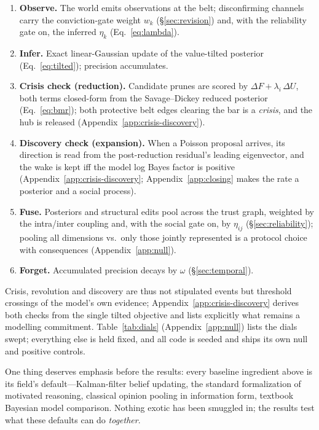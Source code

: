 \documentclass[runningheads]{llncs}
\begin{document}
\begin{enumerate}\itemsep1pt
\item \textbf{Observe.} The world emits observations at the belt; disconfirming channels carry
the conviction-gate weight $w_k$ (\S\ref{sec:revision}) and, with the reliability gate on, the
inferred $\eta_k$ (Eq.~\ref{eq:lambda}).
\item \textbf{Infer.} Exact linear-Gaussian update of the value-tilted posterior
(Eq.~\ref{eq:tilted}); precision accumulates.
\item \textbf{Crisis check (reduction).} Candidate prunes are scored by
$\Delta F+\lambda_i\,\Delta U$, both terms closed-form from the Savage--Dickey reduced
posterior (Eq.~\ref{eq:bmr}); both protective belt edges clearing the bar is a \emph{crisis},
and the hub is released (Appendix~\ref{app:crisis-discovery}).
\item \textbf{Discovery check (expansion).} When a Poisson proposal arrives, its direction is
read from the post-reduction residual's leading eigenvector, and the wake is kept iff the
model log Bayes factor is positive (Appendix~\ref{app:crisis-discovery};
Appendix~\ref{app:closing} makes the rate a posterior and a social process).
\item \textbf{Fuse.} Posteriors and structural edits pool across the trust graph, weighted by
the intra/inter coupling and, with the social gate on, by $\eta_{ij}$
(\S\ref{sec:reliability}); pooling all dimensions vs.\ only those jointly represented is a
protocol choice with consequences (Appendix~\ref{app:null}).
\item \textbf{Forget.} Accumulated precision decays by $\omega$ (\S\ref{sec:temporal}).
\end{enumerate}

Crisis, revolution and discovery are thus not stipulated events but threshold crossings of the
model's own evidence; Appendix~\ref{app:crisis-discovery} derives both checks from the single
tilted objective and lists explicitly what remains a modelling commitment.
Table~\ref{tab:dials} (Appendix~\ref{app:null}) lists the dials swept; everything else is held
fixed, and all code is seeded and ships its own null and positive controls.

One thing deserves emphasis before the results: every baseline ingredient above is its field's
default---Kalman-filter belief updating, the standard formalization of motivated reasoning,
classical opinion pooling in information form, textbook Bayesian model comparison. Nothing
exotic has been smuggled in; the results test what these defaults can do \emph{together}.
\end{document}
